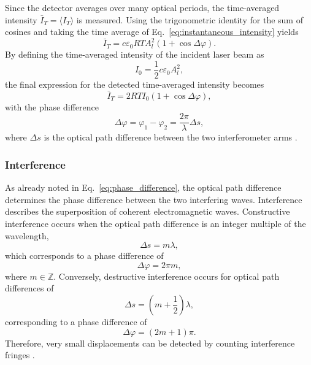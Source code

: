 Since the detector averages over many optical periods, the time-averaged intensity \(\bar{I}_T = \langle I_T \rangle\) is measured. Using the trigonometric identity for the sum of cosines and taking the time average of Eq.~\eqref{eq:instantaneous_intensity} yields
\begin{equation}
\bar{I}_T = c\varepsilon_0 RT A_l^2 (1 + \cos\Delta\varphi).
\end{equation}
By defining the time-averaged intensity of the incident laser beam as
\begin{equation}
I_0 = \frac{1}{2}c\varepsilon_0 A_l^2,
\end{equation}
the final expression for the detected time-averaged intensity becomes
\begin{equation}
\bar{I}_T = 2RTI_0(1+\cos\Delta\varphi),
\label{eq:time_averaged_intensity}
\end{equation}
with the phase difference
\begin{equation}
\Delta\varphi = \varphi_1-\varphi_2=\frac{2\pi}{\lambda}\Delta s,
\label{eq:phase_difference}
\end{equation}
where \(\Delta s\) is the optical path difference between the two interferometer arms .



\subsubsection{Interference}
As already noted in Eq.~\eqref{eq:phase_difference}, the optical path difference determines the phase difference between the two interfering waves. Interference describes the superposition of coherent electromagnetic waves. Constructive interference occurs when the optical path difference is an integer multiple of the wavelength,
\begin{equation}
\Delta s = m\lambda,
\end{equation}
which corresponds to a phase difference of
\begin{equation}
\Delta\varphi = 2\pi m,
\end{equation}
where \(m\in\mathbb{Z}\). Conversely, destructive interference occurs for optical path differences of
\begin{equation}
\Delta s = \left(m+\frac{1}{2}\right)\lambda,
\end{equation}
corresponding to a phase difference of
\begin{equation}
\Delta\varphi = (2m+1)\pi.
\end{equation} Therefore, very small displacements can be detected by counting interference fringes .




